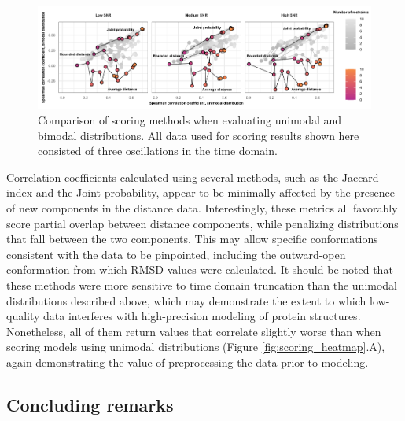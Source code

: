\begin{figure}[h]
\centering
\includegraphics[width=6in]{Figures/scoring_comparison.pdf}
 \caption[Comparison of scoring methods when evaluating unimodal and bimodal distributions.]{Comparison of scoring methods when evaluating unimodal and bimodal distributions. All data used for scoring results shown here consisted of three oscillations in the time domain.}
\label{fig:scoring_comparison}
\end{figure}

Correlation coefficients calculated using several methods, such as the Jaccard index and the Joint probability, appear to be minimally affected by the presence of new components in the distance data. Interestingly, these metrics all favorably score partial overlap between distance components, while penalizing distributions that fall between the two components. This may allow specific conformations consistent with the data to be pinpointed, including the outward-open conformation from which RMSD values were calculated. It should be noted that these methods were more sensitive to time domain truncation than the unimodal distributions described above, which may demonstrate the extent to which low-quality data interferes with high-precision modeling of protein structures. Nonetheless, all of them return values that correlate slightly worse than when scoring models using unimodal distributions (Figure \ref{fig:scoring_heatmap}.A), again demonstrating the value of preprocessing the data prior to modeling.

\subsection{Concluding remarks}

